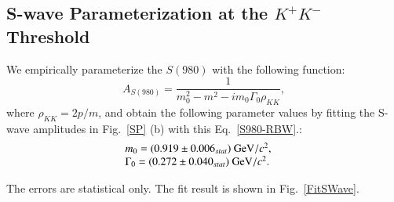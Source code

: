 \subsection{S-wave Parameterization at the $K^{+}K^{-}$ Threshold}
\label{MIPWA-RES}
\par{We empirically parameterize the $S(980)$ with the following function:
    \begin{equation}
        A_{S(980)} = \frac{1}{m_{0}^{2} - m^{2} -im_{0}\Gamma_{0}\rho_{KK}}, \label{S980-RBW}
    \end{equation}
    where $\rho_{KK} = 2p/m$, and obtain the following parameter values by fitting the S-wave amplitudes in Fig.~\ref{SP} (b) with this Eq.~\ref{S980-RBW}.:
    \begin{equation}
        \begin{array}{lr}
            m_{0} = (0.919 \pm 0.006_{stat}) \ {\rm GeV}/c^{2}, &\\
            \Gamma_{0} = (0.272 \pm 0.040_{stat}) \ {\rm GeV}/c^{2}. &
        \end{array}\label{S-wave parameters} 
    \end{equation}


    The errors are statistical only. The fit result is shown in Fig.~\ref{FitSWave}.
    
}
